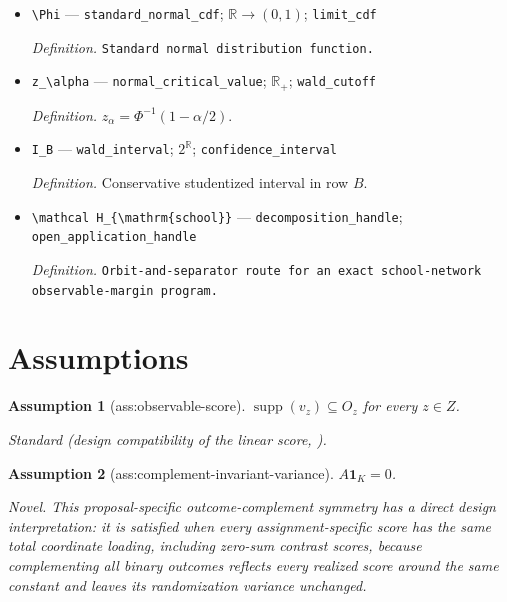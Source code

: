 \documentclass{article}
\newtheorem{assumption}{Assumption}
\begin{document}
\begin{itemize}
  \par\smallskip\noindent\emph{Definition.} \texttt{Nominal error probability.}
  \item \texttt{\textbackslash{}\allowbreak{}Phi} --- \texttt{standard\_\allowbreak{}normal\_\allowbreak{}cdf}; \(\mathbb R\to(0,1)\); \texttt{limit\_\allowbreak{}cdf}
  \par\smallskip\noindent\emph{Definition.} \texttt{Standard normal distribution function.}
  \item \texttt{z\_\allowbreak{}\textbackslash{}\allowbreak{}alpha} --- \texttt{normal\_\allowbreak{}critical\_\allowbreak{}value}; \(\mathbb R_+\); \texttt{wald\_\allowbreak{}cutoff}
  \par\smallskip\noindent\emph{Definition.} \(z_\alpha=\Phi^{-1}(1-\alpha/2)\).
  \item \texttt{I\_\allowbreak{}B} --- \texttt{wald\_\allowbreak{}interval}; \(2^{\mathbb R}\); \texttt{confidence\_\allowbreak{}interval}
  \par\smallskip\noindent\emph{Definition.} Conservative studentized interval in row \(B\).
  \item \texttt{\textbackslash{}\allowbreak{}mathcal H\_\allowbreak{}\{\textbackslash{}\allowbreak{}mathrm\{school\}\allowbreak{}\}\allowbreak{}} --- \texttt{decomposition\_\allowbreak{}handle}; \texttt{open\_\allowbreak{}application\_\allowbreak{}handle}
  \par\smallskip\noindent\emph{Definition.} \texttt{Orbit-\allowbreak{}and-\allowbreak{}separator route for an exact school-\allowbreak{}network observable-\allowbreak{}margin program.}
\end{itemize}

\section{Assumptions}

\begin{assumption}[ass:observable-score]\label{ass:observable-score}
\(\operatorname{supp}(v_z)\subseteq O_z\) for every \(z\in Z\).
\par\smallskip\noindent\emph{Standard} (design compatibility of the linear score, \cite{HarshawMiddletonSavje2026}).
\end{assumption}

\begin{assumption}[ass:complement-invariant-variance]\label{ass:complement-invariant-variance}
\(A\mathbf 1_K=0\).
\par\smallskip\noindent\emph{Novel.} This proposal-specific outcome-complement symmetry has a direct design interpretation: it is satisfied when every assignment-specific score has the same total coordinate loading, including zero-sum contrast scores, because complementing all binary outcomes reflects every realized score around the same constant and leaves its randomization variance unchanged.
\end{assumption}
\end{document}

